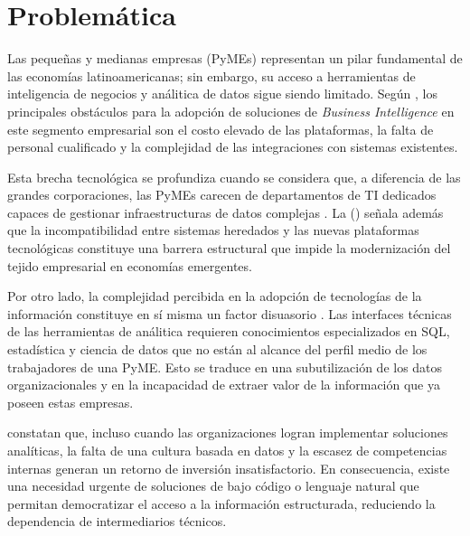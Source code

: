 \section{Problem\'atica}

Las peque\~nas y medianas empresas (PyMEs) representan un pilar fundamental de las econom\'ias
latinoamericanas; sin embargo, su acceso a herramientas de inteligencia de negocios y an\'alitica
de datos sigue siendo limitado. Seg\'un \citet{tovar2011bi}, los principales obst\'aculos para la
adopci\'on de soluciones de \textit{Business Intelligence} en este segmento empresarial son el
costo elevado de las plataformas, la falta de personal cualificado y la complejidad de las
integraciones con sistemas existentes.

Esta brecha tecnol\'ogica se profundiza cuando se considera que, a diferencia de las grandes
corporaciones, las PyMEs carecen de departamentos de TI dedicados capaces de gestionar
infraestructuras de datos complejas \citep{cordero2020sistemas}. La \citeauthor{oecd2023barreras}
(\citeyear{oecd2023barreras}) se\~nala adem\'as que la incompatibilidad entre sistemas heredados y
las nuevas plataformas tecnol\'ogicas constituye una barrera estructural que impide la
modernizaci\'on del tejido empresarial en econom\'ias emergentes.

Por otro lado, la complejidad percibida en la adopci\'on de tecnolog\'ias de la informaci\'on
constituye en s\'i misma un factor disuasorio \citep{nurqamarani2021complejidad}. Las interfaces
t\'ecnicas de las herramientas de an\'alitica requieren conocimientos especializados en SQL,
estad\'istica y ciencia de datos que no est\'an al alcance del perfil medio de los trabajadores
de una PyME. Esto se traduce en una subutilizaci\'on de los datos organizacionales y en la
incapacidad de extraer valor de la informaci\'on que ya poseen estas empresas.

\citet{wamba2017desafios} constatan que, incluso cuando las organizaciones logran implementar
soluciones anal\'iticas, la falta de una cultura basada en datos y la escasez de competencias
internas generan un retorno de inversi\'on insatisfactorio. En consecuencia, existe una necesidad
urgente de soluciones de bajo c\'odigo o lenguaje natural que permitan democratizar el acceso a
la informaci\'on estructurada, reduciendo la dependencia de intermediarios t\'ecnicos.
